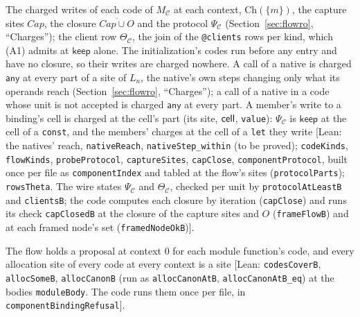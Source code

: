 \documentclass[10pt,a4paper]{article}
\theoremstyle{definition}
\theoremstyle{remark}
\newcommand{\kw}[1]{\mathsf{#1}}
\newcommand{\keep}{\kw{keep}}
\newcommand{\any}{\kw{any}}
\newcommand{\code}[1]{\texttt{#1}}
\newcommand{\lean}[1]{\texttt{\small #1}}
\newcommand{\status}[1]{\textsf{\small[#1]}}
\newcommand{\cC}{\mathcal{C}}
\begin{document}
\begin{description}[leftmargin=1.5em,style=nextline]
\item[(A3) Charges] The charged writes of each code of $M_\cC$ at each
context, $\mathrm{Ch}(\{m\})$, the capture sites $\mathit{Cap}$, the
closure $\overline{\mathit{Cap}\cup O}$ and the protocol $\Psi_\cC$
(Section~\ref{sec:flowro}, ``Charges''); the client row $\Theta_\cC$,
the join of the \code{@clients} rows per kind, which (A1) admits at
$\keep$ alone. The initialization's codes run before any entry and
have no closure, so their writes are charged nowhere. A call of a native
is charged $\any$ at every part of a site of $L_n$, the native's own
steps changing only what its operands reach (Section~\ref{sec:flowro},
``Charges''); a call of a native in a code whose unit is not accepted is
charged $\any$ at every part. A member's write to
a binding's cell is charged at the cell's part (its site, $\mathsf{cell}$,
\code{value}): $\Psi_\cC$ is $\keep$ at the cell of a \code{const}, and
the members' charges at the cell of a \code{let} they write
\status{Lean: the natives' reach, \lean{nativeReach}, \lean{nativeStep\_within} (to be proved); \lean{codeKinds}, \lean{flowKinds}, \lean{probeProtocol}, \lean{captureSites}, \lean{capClose}, \lean{componentProtocol}, built once per file as \lean{componentIndex} and tabled at the flow's sites (\lean{protocolParts}); \lean{rowsTheta}. The wire states $\Psi_\cC$ and $\Theta_\cC$, checked per unit by \lean{protocolAtLeastB} and \lean{clientsB}; the code computes each closure by iteration (\lean{capClose}) and runs its check \lean{capClosedB} at the closure of the capture sites and $O$ (\lean{frameFlowB}) and at each framed node's set (\lean{framedNodeOkB})}.
\item[(A4) Binding checks that read no unit] The flow holds a proposal at
context $0$ for each module function's code, and every allocation site
of every code at every context is a site
\status{Lean: \lean{codesCoverB}, \lean{allocSomeB}, \lean{allocCanonB} (run as \lean{allocCanonAtB}, \lean{allocCanonAtB\_eq}) at the bodies \lean{moduleBody}. The code runs them once per file, in \lean{componentBindingRefusal}}.
\end{description}
\end{document}
